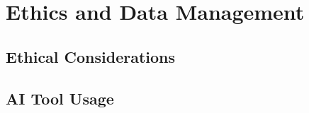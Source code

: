 \chapter{Ethics and Data Management}
\label{edm}


\section{Ethical Considerations}




\section{AI Tool Usage}
\label{sec:ai-usage}

